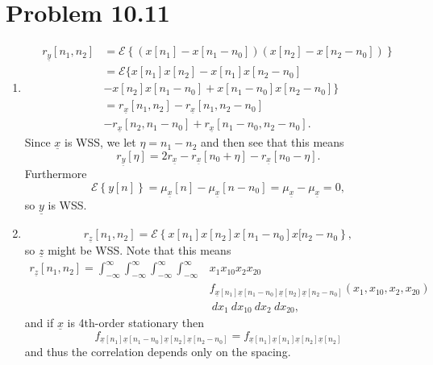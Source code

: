 \documentclass{article}
\begin{document}
\section*{Problem 10.11}
\begin{enumerate}
  \item
  {
  \begin{align*}
  r_{\underline{y}}[n_1,n_2] &= \mathcal{E}\left\{
    (x[n_1] - x[n_1 - n_0])(x[n_2] - x[n_2 - n_0])\right\} \\
  &= \mathcal{E}\{
     x[n_1]x[n_2] - x[n_1]x[n_2-n_0] \\ 
  &- x[n_2]x[n_1-n_0] 
   + x[n_1-n_0]x[n_2-n_0]\} \\
  &= r_{\underline{x}}[n_1,n_2] - r_{\underline{x}}[n_1, n_2-n_0]\\
  &- r_{\underline{x}}[n_2,n_1-n_0] + r_{\underline{x}}[n_1-n_0,n_2-n_0].
  \end{align*}
  Since $\underline{x}$ is WSS, we let $\eta = n_1 - n_2$ and then see that
  this means
  $$
  r_{\underline{y}}[\eta] 
    = 2r_{\underline{x}} 
    - r_{\underline{x}}[n_0 + \eta]
    - r_{\underline{x}}[n_0 - \eta].
  $$
  Furthermore
  $$
  \mathcal{E}\left\{y[n]\right\} 
    = \mu_{\underline{x}}[n] - \mu_{\underline{x}}[n-n_0]
    = \mu_{\underline{x}}-\mu_{\underline{x}} = 0,
  $$
  so $\underline{y}$ is WSS.
  }
  \item
  {
  $$
  r_{\underline{z}}[n_1,n_2] 
    = \mathcal{E}\left\{x[n_1]x[n_2]x[n_1-n_0]x[n_2-n_0\right\},
  $$
  so $\underline{z}$ might be WSS. Note that this means
  \begin{align*}
  r_{\underline{z}}[n_1,n_2]
    = \int_{-\infty}^{\infty}\int_{-\infty}^{\infty}
      \int_{-\infty}^{\infty}\int_{-\infty}^{\infty} &
      x_1 x_{10} x_2 x_{20} \\
      &f_{\underline{x}[n_1]\underline{x}[n_1-n_0]
         \underline{x}[n_2]\underline{x}[n_2-n_0]}(x_1, x_{10}, x_2, x_{20})\\
   &  ~dx_1 ~dx_{10} ~dx_2 ~dx_{20},
  \end{align*}
  and if $\underline{x}$ is 4th-order stationary then
  $$
    f_{\underline{x}[n_1]\underline{x}[n_1-n_0]
       \underline{x}[n_2]\underline{x}[n_2-n_0]} =
    f_{\underline{x}[n_1]\underline{x}[n_1]
       \underline{x}[n_2]\underline{x}[n_2]} 
  $$
  and thus the correlation depends only on the spacing.
  }
\end{enumerate}
\end{document}
